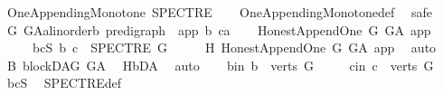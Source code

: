 \begin{isabellebody}
{\isafoldproof}%
%
\isadelimproof
\isanewline
%
\endisadelimproof
\isanewline
{}\isamarkupfalse%
\ {\isachardoublequoteopen}One{\isacharunderscore}{\kern0pt}Appending{\isacharunderscore}{\kern0pt}Monotone\ SPECTRE{\isachardoublequoteclose}\isanewline
%
\isadelimproof
\ \ %
\endisadelimproof
%
\isatagproof
{}\isamarkupfalse%
\ One{\isacharunderscore}{\kern0pt}Appending{\isacharunderscore}{\kern0pt}Monotone{\isacharunderscore}{\kern0pt}def\ \isanewline
{}\isamarkupfalse%
\ safe\isanewline
\ \ \isamarkupfalse%
\ G\ G{\isacharunderscore}{\kern0pt}A{\isacharcolon}{\kern0pt}{\isacharcolon}{\kern0pt}{\isachardoublequoteopen}{\isacharparenleft}{\kern0pt}{\isacharprime}{\kern0pt}a{\isacharcolon}{\kern0pt}{\isacharcolon}{\kern0pt}linorder{\isacharcomma}{\kern0pt}{\isacharprime}{\kern0pt}b{\isacharparenright}{\kern0pt}\ pre{\isacharunderscore}{\kern0pt}digraph{\isachardoublequoteclose}\ \ app\ b\ c{\isacharcolon}{\kern0pt}{\isacharcolon}{\kern0pt}{\isacharprime}{\kern0pt}a\isanewline
\ \ \isamarkupfalse%
\ {\isachardoublequoteopen}Honest{\isacharunderscore}{\kern0pt}Append{\isacharunderscore}{\kern0pt}One\ G\ G{\isacharunderscore}{\kern0pt}A\ app{\isachardoublequoteclose}\isanewline
\ \ \ \ \ bcS{\isacharcolon}{\kern0pt}\ {\isachardoublequoteopen}{\isacharparenleft}{\kern0pt}b{\isacharcomma}{\kern0pt}\ c{\isacharparenright}{\kern0pt}\ {\isasymin}\ SPECTRE\ G{\isachardoublequoteclose}\isanewline
\ \ \isamarkupfalse%
\ \isamarkupfalse%
\ H{}{\isacharcolon}{\kern0pt}\ Honest{\isacharunderscore}{\kern0pt}Append{\isacharunderscore}{\kern0pt}One\ G\ G{\isacharunderscore}{\kern0pt}A\ app\ \isamarkupfalse%
\ auto\isanewline
\ \ \isamarkupfalse%
\ B{}{\isacharcolon}{\kern0pt}\ blockDAG\ G{\isacharunderscore}{\kern0pt}A\ \isamarkupfalse%
\ H{}{\isachardot}{\kern0pt}bD{\isacharunderscore}{\kern0pt}A\ \isamarkupfalse%
\ auto\isanewline
\ \ \isamarkupfalse%
\ b{\isacharunderscore}{\kern0pt}in{\isacharcolon}{\kern0pt}\ {\isachardoublequoteopen}b\ {\isasymin}\ verts\ G{\isachardoublequoteclose}\isanewline
\ \ \ \ \ c{\isacharunderscore}{\kern0pt}in{\isacharcolon}{\kern0pt}\ {\isachardoublequoteopen}c\ {\isasymin}\ verts\ G{\isachardoublequoteclose}\ \isamarkupfalse%
\ bcS\ \isamarkupfalse%
\ SPECTRE{\isacharunderscore}{\kern0pt}def\ \isamarkupfalse%

\end{isabellebody}

